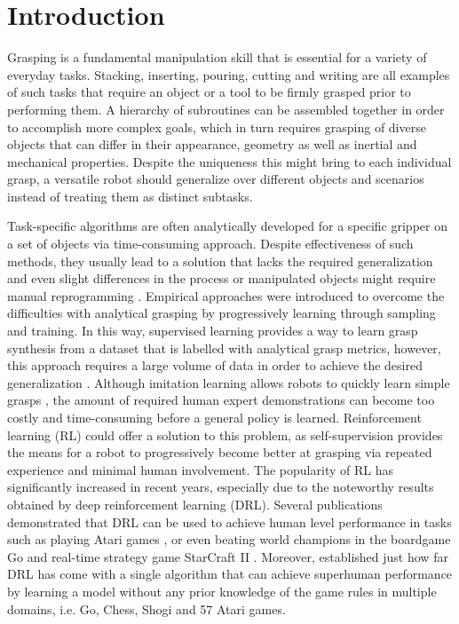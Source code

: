 \chapter{Introduction}

Grasping is a fundamental manipulation skill that is essential for a variety of everyday tasks. Stacking, inserting, pouring, cutting and writing are all examples of such tasks that require an object or a tool to be firmly grasped prior to performing them. A hierarchy of subroutines can be assembled together in order to accomplish more complex goals, which in turn requires grasping of diverse objects that can differ in their appearance, geometry as well as inertial and mechanical properties. Despite the uniqueness this might bring to each individual grasp, a versatile robot should generalize over different objects and scenarios instead of treating them as distinct subtasks.

Task-specific algorithms are often analytically developed for a specific gripper on a set of objects via time-consuming approach. Despite effectiveness of such methods, they usually lead to a solution that lacks the required generalization and even slight differences in the process or manipulated objects might require manual reprogramming \cite{sahbani_overview_2012}. Empirical approaches were introduced to overcome the difficulties with analytical grasping by progressively learning through sampling and training. In this way, supervised learning provides a way to learn grasp synthesis from a dataset that is labelled with analytical grasp metrics, however, this approach requires a large volume of data in order to achieve the desired generalization \cite{mahler_dex-net_2017}. Although imitation learning allows robots to quickly learn simple grasps \cite{zhang_deep_2018}, the amount of required human expert demonstrations can become too costly and time-consuming before a general policy is learned. Reinforcement learning (RL) \cite{sutton_reinforcement_2018} could offer a solution to this problem, as self-supervision provides the means for a robot to progressively become better at grasping via repeated experience and minimal human involvement. The popularity of RL has significantly increased in recent years, especially due to the noteworthy results obtained by deep reinforcement learning (DRL). Several publications demonstrated that DRL can be used to achieve human level performance in tasks such as playing Atari games \cite{mnih_human-level_2015}, or even beating world champions in the boardgame Go \cite{silver_mastering_2017} and real-time strategy game StarCraft II \cite{vinyals_grandmaster_2019}. Moreover, \citet{schrittwieser_mastering_2020} established just how far DRL has come with a single algorithm that can achieve superhuman performance by learning a model without any prior knowledge of the game rules in multiple domains, i.e. Go, Chess, Shogi and 57 Atari games.

